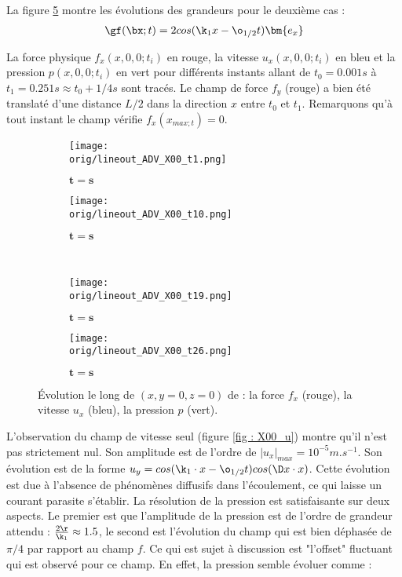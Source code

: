 La figure \ref{fig : X00} montre les évolutions des grandeurs pour le deuxième cas :
\begin{align}
\gf(\bx;t) = 2cos(\k_1 x - \o_{1/2}t) \bm{e_x}
\end{align} 

La force physique $f_x(x,0,0;t_i)$ en rouge, la vitesse $u_x(x,0,0;t_i)$ en bleu et la pression $p(x,0,0;t_i)$ en vert pour différents instants allant de $t_0=0.001s$ à $t_1=0.251s \approx t_0 + 1/4 s$ sont tracés. Le champ de force $f_y$ (rouge) a bien été translaté d'une distance $L/2$ dans la direction $x$ entre $t_0$ et $t_1$.  
Remarquons qu'à tout instant le champ vérifie $f_x(x_{max;t})=0$.

\begin{figure}
\begin{center}
	\begin{subfigure}[t]{0.4\textwidth}                                                                                                                                   
		\texttt{[image: \\orig/lineout\_ADV\_X00\_t1.png]}
		\caption{ $\bm{t=s}$}
		\label{fig : X00_t1}
	\end{subfigure}\hfill
	\begin{subfigure}[t]{0.4\textwidth}
		\texttt{[image: \\orig/lineout\_ADV\_X00\_t10.png]}
		\caption{ $\bm{t=s}$}
		\label{fig : X00_t6}
	\end{subfigure}
\\
	\begin{subfigure}[t]{0.4\textwidth}
		\texttt{[image: \\orig/lineout\_ADV\_X00\_t19.png]}
		\caption{ $\bm{t=s}$}
		\label{fig : X00_t11}
	\end{subfigure}\hfill
	\begin{subfigure}[t]{0.4\textwidth}
		\texttt{[image: \\orig/lineout\_ADV\_X00\_t26.png]}
		\caption{ $\bm{t=s}$}
		\label{fig : X00_t16}
	\end{subfigure}
\end{center}
\caption{Évolution le long de $(x,y=0,z=0)$ de : la force $f_x$ (rouge), la vitesse $u_x$ (bleu), la pression $p$ (vert).}
\label{fig : X00}
\end{figure}

L'observation du champ de vitesse seul (figure \ref{fig : X00_u}) montre qu'il n'est pas strictement nul. Son amplitude est de l'ordre de $|u_x|_{max}=10^{-5} m.s^{-1}$. Son évolution est de la forme $u_y = cos(\k_1 \cdot x - \o_{1/2}t)cos(\D x \cdot x)$. Cette évolution est due à l'absence de phénomènes diffusifs dans l'écoulement, ce qui laisse un courant parasite s'établir. La résolution de la pression est satisfaisante sur deux aspects. Le premier est que l'amplitude de la pression est de l'ordre de grandeur attendu : $\frac{2\r}{\k_1}\approx 1.5$, le second est l'évolution du champ qui est bien déphasée de $\pi/4$ par rapport au champ $f$. Ce qui est sujet à discussion est "l'offset" fluctuant qui est observé pour ce champ. En effet, la pression semble évoluer comme :

